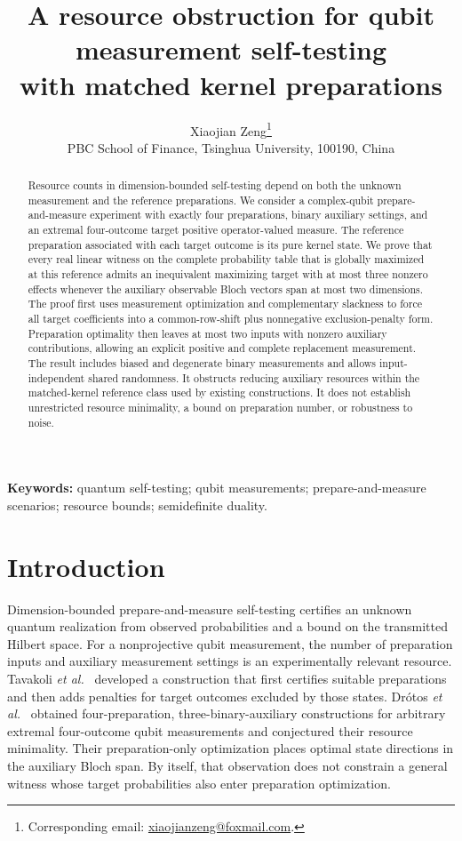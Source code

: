 \documentclass[11pt,a4paper]{article}
\title{A resource obstruction for qubit measurement self-testing\\
with matched kernel preparations}
\author{Xiaojian Zeng\thanks{Corresponding email: \href{mailto:xiaojianzeng@foxmail.com}{xiaojianzeng@foxmail.com}.}\\[0.3em]
\small PBC School of Finance, Tsinghua University, 100190, China}
\date{}
\begin{document}
\maketitle
\begin{abstract}
Resource counts in dimension-bounded self-testing depend on both the unknown
measurement and the reference preparations. We consider a complex-qubit
prepare-and-measure experiment with exactly four preparations, binary auxiliary
settings, and an extremal four-outcome target positive operator-valued measure.
The reference preparation associated with each target outcome is its pure kernel
state. We prove that every real linear witness on the complete probability table
that is globally maximized at this reference admits an inequivalent maximizing
target with at most three nonzero effects whenever the auxiliary observable
Bloch vectors span at most two dimensions. The proof first uses measurement
optimization and complementary slackness to force all target coefficients into
a common-row-shift plus nonnegative exclusion-penalty form. Preparation optimality
then leaves at most two inputs with nonzero auxiliary contributions, allowing an
explicit positive and complete replacement measurement. The result includes biased
and degenerate binary measurements and allows input-independent shared randomness.
It obstructs reducing auxiliary resources within the matched-kernel reference
class used by existing constructions. It does not establish unrestricted resource
minimality, a bound on preparation number, or robustness to noise.
\end{abstract}
\noindent\textbf{Keywords:} quantum self-testing; qubit measurements;
prepare-and-measure scenarios; resource bounds; semidefinite duality.

\section{Introduction}

Dimension-bounded prepare-and-measure self-testing certifies an unknown quantum
realization from observed probabilities and a bound on the transmitted Hilbert
space. For a nonprojective qubit measurement, the number of preparation inputs
and auxiliary measurement settings is an experimentally relevant resource.
Tavakoli \emph{et al.}~\cite{Tavakoli2020} developed a construction that first
certifies suitable preparations and then adds penalties for target outcomes
excluded by those states. Dr\'otos \emph{et al.}~\cite{Drotos2024} obtained
four-preparation, three-binary-auxiliary constructions for arbitrary extremal
four-outcome qubit measurements and conjectured their resource minimality.
Their preparation-only optimization places optimal state directions in the
auxiliary Bloch span. By itself, that observation does not constrain a general
witness whose target probabilities also enter preparation optimization.
\end{document}
